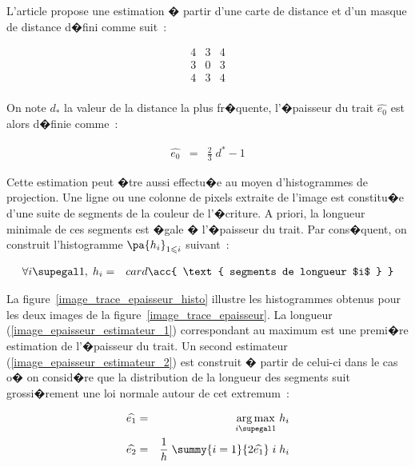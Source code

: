 L'article  propose une estimation � partir d'une carte de distance et d'un masque de distance d�fini comme suit~:

            $$
            \begin{array}{c|c|c}
            4 & 3 & 4 \\ \hline
            3 & 0 & 3 \\ \hline
            4 & 3 & 4 \\
            \end{array}
            $$

On note $d_*$ la valeur de la distance la plus fr�quente, l'�paisseur du trait $\widehat{e_0}$ est alors d�finie comme~:

            \begin{eqnarray}
            \widehat{e_0} &=& \frac{2}{3} \; d^* - 1
            \end{eqnarray}



Cette estimation peut �tre aussi effectu�e au moyen d'histogrammes de projection. Une ligne ou une colonne de pixels extraite de l'image est constitu�e d'une suite de segments de la couleur de l'�criture. A priori, la longueur minimale de ces segments est �gale � l'�paisseur du trait. Par cons�quent, on construit l'histogramme $\pa{h_i}_{1 \leqslant i }$ suivant~:

            \begin{eqnarray}
            \forall i \supegal 1, \; h_i &=& card  \acc{ \text{ segments de longueur $i$ } }
            \end{eqnarray}


La figure~\ref{image_trace_epaisseur_histo} illustre les histogrammes obtenus pour les deux images de la figure~\ref{image_trace_epaisseur}. La longueur (\ref{image_epaisseur_estimateur_1}) correspondant au maximum est une premi�re estimation de l'�paisseur du trait. Un second estimateur (\ref{image_epaisseur_estimateur_2}) est construit � partir de celui-ci dans le cas o� on consid�re que la distribution de la longueur des segments suit grossi�rement une loi normale autour de cet extremum~: 

        \begin{eqnarray}
        \widehat{e_1} &=&    \underset{i \supegal 1}{\arg \max} \; h_i \label{image_epaisseur_estimateur_1} \\
        \widehat{e_2}    &=&    \frac{1}{h} \; \summy{i = 1}{2\widehat{e_1}} \; i \; h_i  
                                                                                            \label{image_epaisseur_estimateur_2} 
        \end{eqnarray}



